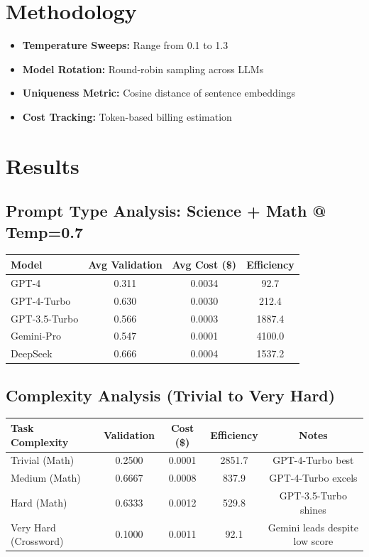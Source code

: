 \documentclass{article}
\begin{document}
\section{Methodology}
\begin{itemize}
  \item \textbf{Temperature Sweeps:} Range from 0.1 to 1.3
  \item \textbf{Model Rotation:} Round-robin sampling across LLMs
  \item \textbf{Uniqueness Metric:} Cosine distance of sentence embeddings
  \item \textbf{Cost Tracking:} Token-based billing estimation
\end{itemize}

\section{Results}
\subsection*{Prompt Type Analysis: Science + Math @ Temp=0.7}
\begin{center}
\begin{tabular}{lccc}
\toprule
Model & Avg Validation & Avg Cost (\$) & Efficiency \\
\midrule
GPT-4 & 0.311 & 0.0034 & 92.7 \\
GPT-4-Turbo & 0.630 & 0.0030 & 212.4 \\
GPT-3.5-Turbo & 0.566 & 0.0003 & 1887.4 \\
Gemini-Pro & 0.547 & 0.0001 & 4100.0 \\
DeepSeek & 0.666 & 0.0004 & 1537.2 \\
\bottomrule
\end{tabular}
\end{center}

\subsection*{Complexity Analysis (Trivial to Very Hard)}
\begin{center}
\begin{tabular}{lcccc}
\toprule
Task Complexity & Validation & Cost (\$) & Efficiency & Notes \\
\midrule
Trivial (Math) & 0.2500 & 0.0001 & 2851.7 & GPT-4-Turbo best \\
Medium (Math) & 0.6667 & 0.0008 & 837.9 & GPT-4-Turbo excels \\
Hard (Math) & 0.6333 & 0.0012 & 529.8 & GPT-3.5-Turbo shines \\
Very Hard (Crossword) & 0.1000 & 0.0011 & 92.1 & Gemini leads despite low score \\
\bottomrule
\end{tabular}
\end{center}
\end{document}
